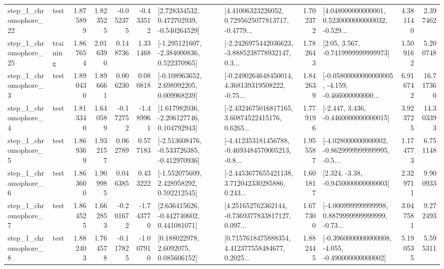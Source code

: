 \begin{tabular}{llrrrrllrlrr}
    step\_1\_chromophore\_22 &      test &      1.875899 &    1.823525 &     -0.052375 & -0.433512 &    [2.728334532, 0.472702939, -0.540264529] &  [4.41006323226052, 0.7295625077813717, -0.4779... &       1.702372 &  [4.048000000000001, 0.5230000000000032, -0.529... &            4.381140 &          2.397462 \\
    step\_1\_chromophore\_25 &  training &      1.867654 &    2.016390 &      0.148736 &  1.331468 &   [-1.295121607, -2.384000836, 0.522370965] &  [-2.2426975442036623, -3.8885238778932147, 0.3... &       1.782643 &                 [2.05, 3.567, -0.7419999999999973] &            1.509162 &          5.200748 \\
     step\_1\_chromophore\_3 &      test &      1.890430 &    1.896661 &      0.006230 &  0.080818 &    [-0.108963652, 2.698992205, 0.009968239] &  [-0.2490264648450014, 4.368139319508222, -0.75... &       1.842639 &  [-0.05800000000000005, -4.159, -0.466000000000... &            6.916742 &         16.717360 \\
     step\_1\_chromophore\_4 &      test &      1.813340 &    1.640589 &     -0.172752 & -1.489961 &    [1.617982036, -2.206127746, 0.104792943] &  [-2.4324675016817165, 3.60874522415176, 0.6265... &       1.779196 &               [-2.447, 3.436, -0.4460000000000015] &            3.923725 &         14.303393 \\
     step\_1\_chromophore\_5 &      test &      1.869369 &    1.932157 &      0.062789 &  0.577183 &  [-2.513608476, -0.533726385, -0.412970936] &  [-4.412353181456788, -0.4693484570005213, -0.8... &       1.955587 &  [-4.028000000000002, -0.8629999999999995, -0.5... &            1.174773 &          6.751148 \\
     step\_1\_chromophore\_6 &      test &      1.863600 &    1.909985 &      0.046385 &  0.433222 &    [-1.552075609, 2.428958292, 0.592212545] &  [-2.4453677655421138, 3.712042330285886, 0.243... &       1.601817 &                [2.324, -3.38, -0.9450000000000003] &            2.329711 &          9.900933 \\
     step\_1\_chromophore\_7 &      test &      1.864525 &    1.662853 &     -0.201672 & -1.743770 &    [2.636415626, -0.442740602, 0.441081071] &  [4.251652762362144, -0.7369377833817127, 0.097... &       1.677300 &  [-4.000999999999998, 0.8879999999999999, -0.73... &            3.047581 &          9.272493 \\
     step\_1\_chromophore\_8 &      test &      1.882403 &    1.764578 &     -0.117825 & -1.007910 &       [0.188022978, 2.6092075, 0.085606152] &  [0.7157618475888354, 4.412377558484677, 0.2025... &       1.882445 &  [-0.3960000000000008, -4.055, -0.490000000000002] &            5.190535 &          5.595311 \\

\end{tabular}
